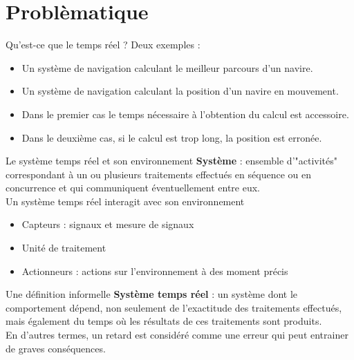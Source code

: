 \part{Problèmatique}

\begin{frame}{Qu'est-ce que le temps réel ?}
  Deux exemples :
  \begin{itemize} 
  \item Un  système de navigation calculant le  meilleur parcours d'un
    navire.
  \item Un système de navigation  calculant la position d'un navire en
    mouvement.
  \end{itemize}     
  \begin{itemize}
  \item  Dans le  premier cas  le  temps nécessaire  à l'obtention  du
    calcul est accessoire.
  \item Dans le deuxième cas, si  le calcul est trop long, la position
    est erronée.
  \end{itemize}
\end{frame}

\begin{frame}{Le système temps réel et son environnement}
  \textbf{Système}  :  ensemble d'"activités"  correspondant  à un  ou
  plusieurs traitements effectués en séquence ou en concurrence et qui
  communiquent  éventuellement entre eux.\\[3mm]

  Un système temps réel interagit avec son environnement
  \begin{itemize}
  \item Capteurs : signaux et mesure de signaux
  \item Unité de traitement
  \item Actionneurs : actions sur l'environnement à des moment précis
  \end{itemize}
\end{frame}

\begin{frame}{Une définition informelle}
  \textbf{Système  temps réel  }  : un  système  dont le  comportement
  dépend,  non seulement  de l'exactitude  des  traitements effectués,
  mais également
  du temps où les résultats de ces traitements sont produits.\\[3mm]

  En d'autres  termes, un  retard est considéré  comme une  erreur qui
  peut entrainer de graves  conséquences.  

\end{frame}

